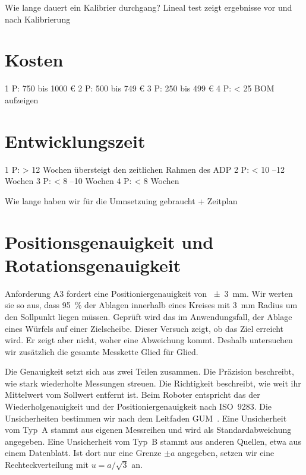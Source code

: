 Wie lange dauert ein Kalibrier durchgang?
Lineal test zeigt ergebnisse vor und nach Kalibrierung

\section{Kosten}
\label{sec:Kosten_Verifikation}
1 P: 750 bis 1000 €
2 P: 500 bis 749 €
3 P: 250 bis 499 €
4 P: < 25
BOM aufzeigen

\section{Entwicklungszeit}
\label{sec:Entwicklungszeit_Verifikation}
1 P: > 12 Wochen übersteigt den zeitlichen Rahmen des ADP
2 P: < 10 --12 Wochen
3 P: < 8 --10 Wochen
4 P: < 8 Wochen

Wie lange haben wir für die Umnsetzuing gebraucht + Zeitplan

\section{Positionsgenauigkeit und Rotationsgenauigkeit}
\label{sec:Positionsgenauigkeit und Rotationsgenauigkeit_Verifikation}


Anforderung A3 fordert eine Positioniergenauigkeit von \qty{\pm 3}{\milli\metre}. Wir werten sie so aus, dass \qty{95}{\percent} der Ablagen innerhalb eines Kreises mit \qty{3}{\milli\metre} Radius um den Sollpunkt liegen müssen. Geprüft wird das im Anwendungsfall, der Ablage eines Würfels auf einer Zielscheibe. Dieser Versuch zeigt, ob das Ziel erreicht wird. Er zeigt aber nicht, woher eine Abweichung kommt. Deshalb untersuchen wir zusätzlich die gesamte Messkette Glied für Glied.

Die Genauigkeit setzt sich aus zwei Teilen zusammen. Die Präzision beschreibt, wie stark wiederholte Messungen streuen. Die Richtigkeit beschreibt, wie weit ihr Mittelwert vom Sollwert entfernt ist. Beim Roboter entspricht das der Wiederholgenauigkeit und der Positioniergenauigkeit nach ISO~9283. %
Die Unsicherheiten bestimmen wir nach dem Leitfaden GUM~\cite{JCGM100}. Eine Unsicherheit vom Typ~A stammt aus eigenen Messreihen und wird als Standardabweichung angegeben. Eine Unsicherheit vom Typ~B stammt aus anderen Quellen, etwa aus einem Datenblatt. Ist dort nur eine Grenze $\pm a$ angegeben, setzen wir eine Rechteckverteilung mit $u = a/\sqrt{3}$ an.


